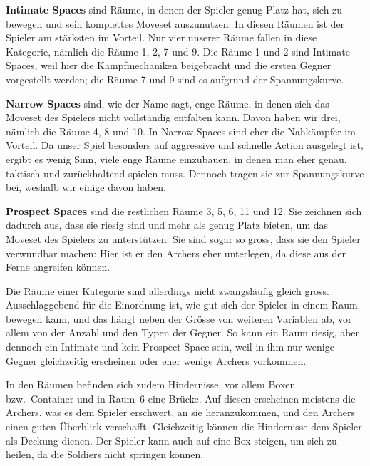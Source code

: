 \documentclass[../Main.tex]{subfiles}
\begin{document}
\textbf{Intimate Spaces} sind Räume, in denen der Spieler genug Platz hat, sich zu bewegen und sein komplettes Moveset auszunutzen. In diesen Räumen ist der Spieler am stärksten im Vorteil. Nur vier unserer Räume fallen in diese Kategorie, nämlich die Räume 1, 2, 7 und 9. Die Räume 1 und 2 sind Intimate Spaces, weil hier die Kampfmechaniken beigebracht und die ersten Gegner vorgestellt werden; die Räume 7 und 9 sind es aufgrund der Spannungskurve.

\textbf{Narrow Spaces} sind, wie der Name sagt, enge Räume, in denen sich das Moveset des Spielers nicht vollständig entfalten kann. Davon haben wir drei, nämlich die Räume 4, 8 und 10. In Narrow Spaces sind eher die Nahkämpfer im Vorteil. Da unser Spiel besonders auf aggressive und schnelle Action ausgelegt ist, ergibt es wenig Sinn, viele enge Räume einzubauen, in denen man eher genau, taktisch und zurückhaltend spielen muss. Dennoch tragen sie zur Spannungskurve bei, weshalb wir einige davon haben.

\textbf{Prospect Spaces} sind die restlichen Räume 3, 5, 6, 11 und 12. Sie zeichnen sich dadurch aus, dass sie riesig sind und mehr als genug Platz bieten, um das Moveset des Spielers zu unterstützen. Sie sind sogar so gross, dass sie den Spieler verwundbar machen: Hier ist er den Archers eher unterlegen, da diese aus der Ferne angreifen können.

Die Räume einer Kategorie sind allerdings nicht zwangsläufig gleich gross. Ausschlaggebend für die Einordnung ist, wie gut sich der Spieler in einem Raum bewegen kann, und das hängt neben der Grösse von weiteren Variablen ab, vor allem von der Anzahl und den Typen der Gegner. So kann ein Raum riesig, aber dennoch ein Intimate und kein Prospect Space sein, weil in ihm nur wenige Gegner gleichzeitig erscheinen oder eher wenige Archers vorkommen.

In den Räumen befinden sich zudem Hindernisse, vor allem Boxen bzw.\ Container und in Raum~6 eine Brücke. Auf diesen erscheinen meistens die Archers, was es dem Spieler erschwert, an sie heranzukommen, und den Archers einen guten Überblick verschafft. Gleichzeitig können die Hindernisse dem Spieler als Deckung dienen. Der Spieler kann auch auf eine Box steigen, um sich zu heilen, da die Soldiers nicht springen können.
\end{document}
